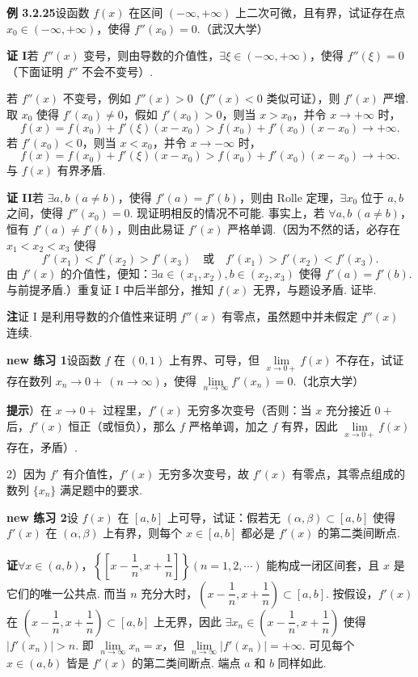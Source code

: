 \documentclass[UTF8, 12pt, fontset=fandol, oneside]{ctexart}
\begin{document}
\noindent\textbf{例 3.2.25}\quad 设函数 $f(x)$ 在区间 $(-\infty,+\infty)$ 上二次可微，且有界，试证存在点 $x_0\in(-\infty,+\infty)$，使得 $f''(x_0)=0$.（武汉大学）

\noindent\textbf{证 I}\quad 若 $f''(x)$ 变号，则由导数的介值性，$\exists\xi\in(-\infty,+\infty)$，使得 $f''(\xi)=0$（下面证明 $f''$ 不会不变号）.

若 $f''(x)$ 不变号，例如 $f''(x)>0$（$f''(x)<0$ 类似可证），则 $f'(x)$ 严增. 取 $x_0$ 使得 $f'(x_0)\ne0$，假如 $f'(x_0)>0$，则当 $x>x_0$，并令 $x\to+\infty$ 时，
\[
  f(x)=f(x_0)+f'(\xi)(x-x_0)>f(x_0)+f'(x_0)(x-x_0)\to+\infty.
\]
若 $f'(x_0)<0$，则当 $x<x_0$，并令 $x\to-\infty$ 时，
\[
  f(x)=f(x_0)+f'(\xi)(x-x_0)>f(x_0)+f'(x_0)(x-x_0)\to+\infty.
\]
与 $f(x)$ 有界矛盾.

\noindent\textbf{证 II}\quad 若 $\exists a,b\ (a\ne b)$，使得 $f'(a)=f'(b)$，则由 Rolle 定理，$\exists x_0$ 位于 $a,b$ 之间，使得 $f''(x_0)=0$. 现证明相反的情况不可能. 事实上，若 $\forall a,b\ (a\ne b)$，恒有 $f'(a)\ne f'(b)$，则由此易证 $f'(x)$ 严格单调.（因为不然的话，必存在 $x_1<x_2<x_3$ 使得
\[
  f'(x_1)<f'(x_2)>f'(x_3)\quad\text{或}\quad f'(x_1)>f'(x_2)<f'(x_3).
\]
由 $f'(x)$ 的介值性，便知：$\exists a\in(x_1,x_2),b\in(x_2,x_3)$ 使得 $f'(a)=f'(b)$. 与前提矛盾.）重复证 I 中后半部分，推知 $f(x)$ 无界，与题设矛盾. 证毕.

\noindent\textbf{注}\quad 证 I 是利用导数的介值性来证明 $f''(x)$ 有零点，虽然题中并未假定 $f''(x)$ 连续.

\noindent\textbf{new 练习 1}\quad 设函数 $f$ 在 $(0,1)$ 上有界、可导，但 $\lim\limits_{x\to0+}f(x)$ 不存在，试证存在数列 $x_n\to0+\ (n\to\infty)$，使得 $\lim\limits_{n\to\infty}f'(x_n)=0$.（北京大学）

\noindent\textbf{提示}）在 $x\to0+$ 过程里，$f'(x)$ 无穷多次变号（否则：当 $x$ 充分接近 $0+$ 后，$f'(x)$ 恒正（或恒负），那么 $f$ 严格单调，加之 $f$ 有界，因此 $\lim\limits_{x\to0+}f(x)$ 存在，矛盾）.

2）因为 $f'$ 有介值性，$f'(x)$ 无穷多次变号，故 $f'(x)$ 有零点，其零点组成的数列 $\{x_n\}$ 满足题中的要求.

\noindent\textbf{new 练习 2}\quad 设 $f(x)$ 在 $[a,b]$ 上可导，试证：假若无 $(\alpha,\beta)\subset[a,b]$ 使得 $f'(x)$ 在 $(\alpha,\beta)$ 上有界，则每个 $x\in[a,b]$ 都必是 $f'(x)$ 的第二类间断点.

\noindent\textbf{证}\quad $\forall x\in(a,b)$，$\left\{\left[x-\dfrac1n,x+\dfrac1n\right]\right\}(n=1,2,\cdots)$ 能构成一闭区间套，且 $x$ 是它们的唯一公共点. 而当 $n$ 充分大时，$\left(x-\dfrac1n,x+\dfrac1n\right)\subset[a,b]$. 按假设，$f'(x)$ 在 $\left(x-\dfrac1n,x+\dfrac1n\right)\subset[a,b]$ 上无界，因此 $\exists x_n\in\left(x-\dfrac1n,x+\dfrac1n\right)$ 使得 $|f'(x_n)|>n$. 即 $\lim\limits_{n\to\infty}x_n=x$，但 $\lim\limits_{n\to\infty}|f'(x_n)|=+\infty$. 可见每个 $x\in(a,b)$ 皆是 $f'(x)$ 的第二类间断点. 端点 $a$ 和 $b$ 同样如此.
\end{document}
